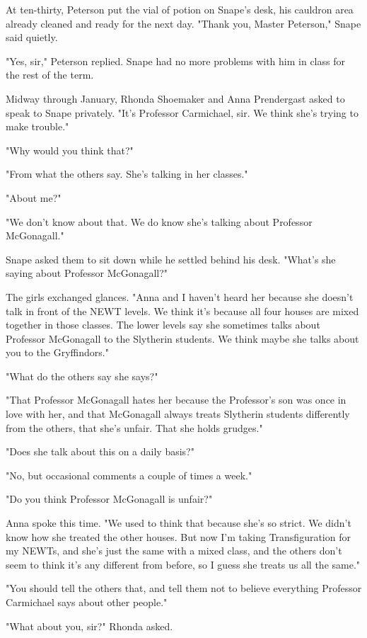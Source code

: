 At ten-thirty, Peterson put the vial of potion on Snape's desk, his cauldron area already cleaned and ready for the next day. "Thank you, Master Peterson," Snape said quietly.

"Yes, sir," Peterson replied. Snape had no more problems with him in class for the rest of the term.

Midway through January, Rhonda Shoemaker and Anna Prendergast asked to speak to Snape privately. "It's Professor Carmichael, sir. We think she's trying to make trouble."

"Why would you think that?"

"From what the others say. She's talking in her classes."

"About me?"

"We don't know about that. We do know she's talking about Professor McGonagall."

Snape asked them to sit down while he settled behind his desk. "What's she saying about Professor McGonagall?"

The girls exchanged glances. "Anna and I haven't heard her because she doesn't talk in front of the NEWT levels. We think it's because all four houses are mixed together in those classes. The lower levels say she sometimes talks about Professor McGonagall to the Slytherin students. We think maybe she talks about you to the Gryffindors."

"What do the others say she says?"

"That Professor McGonagall hates her because the Professor's son was once in love with her, and that McGonagall always treats Slytherin students differently from the others, that she's unfair. That she holds grudges."

"Does she talk about this on a daily basis?"

"No, but occasional comments a couple of times a week."

"Do you think Professor McGonagall is unfair?"

Anna spoke this time. "We used to think that because she's so strict. We didn't know how she treated the other houses. But now I'm taking Transfiguration for my NEWTs, and she's just the same with a mixed class, and the others don't seem to think it's any different from before, so I guess she treats us all the same."

"You should tell the others that, and tell them not to believe everything Professor Carmichael says about other people."

"What about you, sir?" Rhonda asked.

